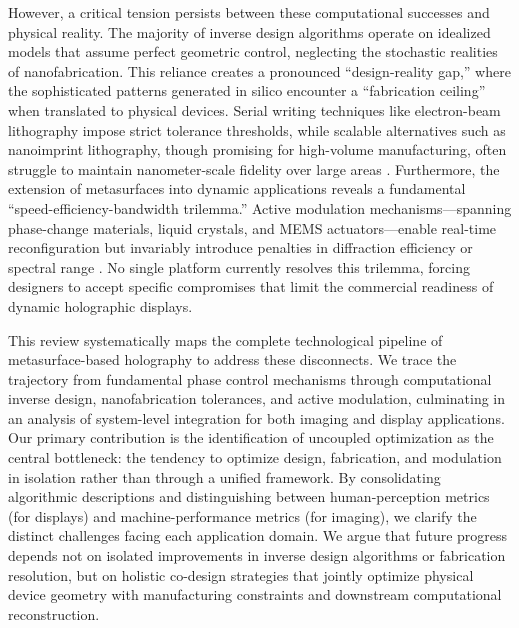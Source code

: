 \documentclass[11pt]{article}
\begin{document}
However, a critical tension persists between these computational successes and physical reality. The majority of inverse design algorithms operate on idealized models that assume perfect geometric control, neglecting the stochastic realities of nanofabrication. This reliance creates a pronounced ``design-reality gap,'' where the sophisticated patterns generated in silico encounter a ``fabrication ceiling'' when translated to physical devices. Serial writing techniques like electron-beam lithography impose strict tolerance thresholds, while scalable alternatives such as nanoimprint lithography, though promising for high-volume manufacturing, often struggle to maintain nanometer-scale fidelity over large areas \citep{doi_10_3390_encyclopedia5040197_fe6bfdc9}. Furthermore, the extension of metasurfaces into dynamic applications reveals a fundamental ``speed-efficiency-bandwidth trilemma.'' Active modulation mechanisms---spanning phase-change materials, liquid crystals, and MEMS actuators---enable real-time reconfiguration but invariably introduce penalties in diffraction efficiency or spectral range \citep{doi_10_1002_lpor_71186_5fa1be75}. No single platform currently resolves this trilemma, forcing designers to accept specific compromises that limit the commercial readiness of dynamic holographic displays.

This review systematically maps the complete technological pipeline of metasurface-based holography to address these disconnects. We trace the trajectory from fundamental phase control mechanisms through computational inverse design, nanofabrication tolerances, and active modulation, culminating in an analysis of system-level integration for both imaging and display applications. Our primary contribution is the identification of uncoupled optimization as the central bottleneck: the tendency to optimize design, fabrication, and modulation in isolation rather than through a unified framework. By consolidating algorithmic descriptions and distinguishing between human-perception metrics (for displays) and machine-performance metrics (for imaging), we clarify the distinct challenges facing each application domain. We argue that future progress depends not on isolated improvements in inverse design algorithms or fabrication resolution, but on holistic co-design strategies that jointly optimize physical device geometry with manufacturing constraints and downstream computational reconstruction.
\end{document}
